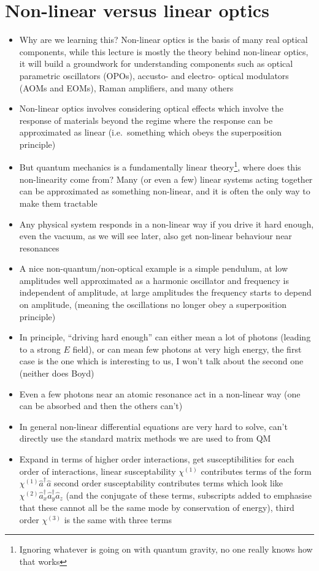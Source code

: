 \documentclass[english]{article}
\begin{document}
\section{Non-linear versus linear optics}
\begin{itemize}
\item Why are we learning this? Non-linear optics is the basis of many real optical components, while this lecture is mostly the theory behind non-linear optics, it will build a groundwork for understanding components such as optical parametric oscillators (OPOs), accusto- and electro- optical modulators (AOMs and EOMs), Raman amplifiers, and many others
\item Non-linear optics involves considering optical effects which involve the response of materials beyond the regime where the response can be approximated as linear (i.e.~something which obeys the superposition principle)
\item But quantum mechanics is a fundamentally linear theory\footnote{Ignoring whatever is going on with quantum gravity, no one really knows how that works}, where does this non-linearity come from?  Many (or even a few) linear systems acting together can be approximated as something non-linear, and it is often the only way to make them tractable
\item Any physical system responds in a non-linear way if you drive it hard enough, even the vacuum, as we will see later, also get non-linear behaviour near resonances
\item A nice non-quantum/non-optical example is a simple pendulum, at low amplitudes well approximated as a harmonic oscillator and frequency is independent of amplitude, at large amplitudes the frequency starts to depend on amplitude, (meaning the oscillations no longer obey a superposition principle)
\item In principle, ``driving hard enough'' can either mean a lot of photons (leading to a strong $E$ field), or can mean few photons at very high energy, the first case is the one which is interesting to us, I won't talk about the second one (neither does Boyd)
\item Even a few photons near an atomic resonance act in a non-linear way (one can be absorbed and then the others can't)
\item In general non-linear differential equations are very hard to solve, can't directly use the standard matrix methods we are used to from QM
\item Expand in terms of higher order interactions, get susceptibilities for each order of interactions, linear susceptability $\chi^{(1)}$ contributes terms of the form $\chi^{(1)}\hat{a}^\dagger\hat{a}$ second order susceptability contributes terms which look like $\chi^{(2)}\hat{a}_x^\dagger\hat{a}_y^\dagger\hat{a}_z$ (and the conjugate of these terms, subscripts added to emphasise that these cannot all be the same mode by conservation of energy), third order $\chi^{(3)}$ is the same with three terms

\end{itemize}
\end{document}
